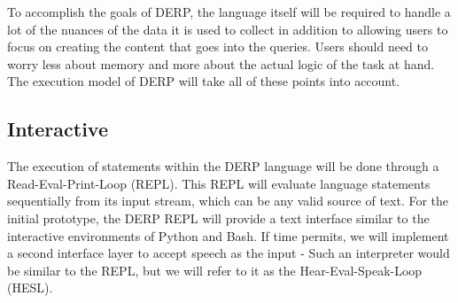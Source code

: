 To accomplish the goals of DERP, the language itself will be required to handle a lot of the nuances of the data it is used to collect in addition to allowing users to focus on creating the content that goes into the queries. Users should need to worry less about memory and more about the actual logic of the task at hand. The execution model of DERP will take all of these points into account. 



\subsection{Interactive}
The execution of statements within the DERP language will be done through a Read-Eval-Print-Loop (REPL). This REPL will evaluate language statements sequentially from its  input stream, which can be any valid source of text. For the initial prototype, the DERP REPL will provide a text interface similar to the interactive environments of Python and Bash. If time permits, we will implement a second interface layer to accept speech as the input - Such an interpreter would be similar to the REPL, but we will refer to it as the Hear-Eval-Speak-Loop (HESL).  
